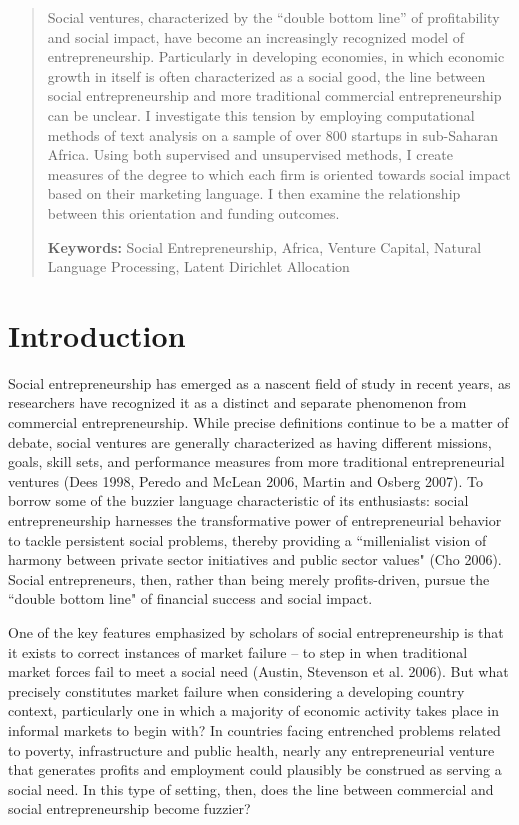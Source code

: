 \documentclass[12pt]{article}
\begin{document}
\maketitle

\begin{abstract}
Social ventures, characterized by the ``double bottom line'' of profitability and social impact, have become an increasingly recognized model of entrepreneurship. Particularly in developing economies, in which economic growth in itself is often characterized as a social good, the line between social entrepreneurship and more traditional commercial entrepreneurship can be unclear. I investigate this tension by employing computational methods of text analysis on a sample of over 800 startups in sub-Saharan Africa. Using both supervised and unsupervised methods, I create measures of the degree to which each firm is oriented towards social impact based on their marketing language. I then examine the relationship between this orientation and funding outcomes.

\smallskip
\noindent \textbf{Keywords:} Social Entrepreneurship, Africa, Venture Capital, Natural Language Processing, Latent Dirichlet Allocation 

\end{abstract}


\section{Introduction}


Social entrepreneurship has emerged as a nascent field of study in recent years, as researchers have recognized it as a distinct and separate phenomenon from commercial entrepreneurship. While precise definitions continue to be a matter of debate, social ventures are generally characterized as having different missions, goals, skill sets, and performance measures from more traditional entrepreneurial ventures (Dees 1998, Peredo and McLean 2006, Martin and Osberg 2007). To borrow some of the buzzier language characteristic of its enthusiasts: social entrepreneurship harnesses the transformative power of entrepreneurial behavior to tackle persistent social problems, thereby providing a ``millenialist vision of harmony between private sector initiatives and public sector values" (Cho 2006). Social entrepreneurs, then, rather than being merely profits-driven, pursue the ``double bottom line" of financial success and social impact. 

One of the key features emphasized by scholars of social entrepreneurship is that it exists to correct instances of market failure -- to step in when traditional market forces fail to meet a social need (Austin, Stevenson et al. 2006). But what precisely constitutes market failure when considering a developing country context, particularly one in which a majority of economic activity takes place in informal markets to begin with? In countries facing entrenched problems related to poverty, infrastructure and public health, nearly any entrepreneurial venture that generates profits and employment could plausibly be construed as serving a social need. In this type of setting, then, does the line between commercial and social entrepreneurship become fuzzier?
\end{document}

